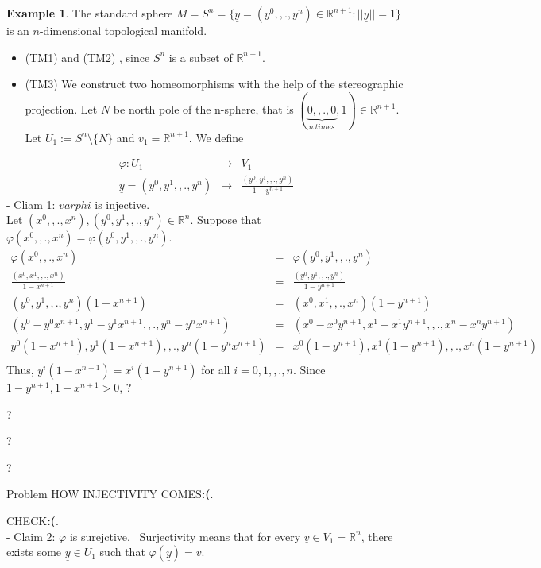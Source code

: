 \documentclass[
]{book}
\providecommand{\tightlist}{%
  \setlength{\itemsep}{0pt}\setlength{\parskip}{0pt}}
\theoremstyle{definition}
\theoremstyle{definition}
\newtheorem{example}{Example}[chapter]
\theoremstyle{definition}
\theoremstyle{definition}
\theoremstyle{remark}
\begin{document}
\begin{example}
\protect\hypertarget{exm:unnamed-chunk-10}{}\label{exm:unnamed-chunk-10}The standard sphere \(M = S^n = \{ \underline{y}=(y^0,,.,y^{n}) \in \mathbb{R}^{n+1} : ||\underline{y}|| = 1 \}\) is an \(n\)-dimensional topological manifold.

\begin{itemize}
\tightlist
\item
  (TM1) and (TM2) , since \(S^n\) is a subset of \(\mathbb{R}^{n+1}\).
\item
  (TM3) We construct two homeomorphisms with the help of the stereographic projection. Let \(N\) be north pole of the n-sphere, that is \((\underbrace{0,,.,0}_{n~times},1)\in \mathbb{R}^{n+1}\). Let \(U_1:=S^n\setminus \{N\}\) and \(v_1=\mathbb{R}^{n+1}\). We define
\end{itemize}

\begin{eqnarray}
\varphi:U_1&\to & V_1\\
\underline{y} =(y^0,y^1,,.,y^n) & \mapsto & \frac{(y^0,y^1,,.,y^n)}{1-y^{n+1}}
\end{eqnarray}
- Cliam 1: \(varphi\) is injective.\\
Let \((x^0,,.,x^{n}),(y^0,y^1,,.,y^n)\in \mathbb{R}^n\). Suppose that \(\varphi(x^0,,.,x^{n})=\varphi(y^0,y^1,,.,y^n)\).
\begin{eqnarray}
\varphi(x^0,,.,x^{n})&=&\varphi(y^0,y^1,,.,y^n)\\
\frac{(x^0,x^1,,.,x^n)}{1-x^{n+1}}&=&\frac{(y^0,y^1,,.,y^n)}{1-y^{n+1}}\\
(y^0, y^1, ,., y^n)(1-x^{n+1}) &=& (x^0, x^1, ,., x^n)(1-y^{n+1})\\
(y^0 - y^0x^{n+1}, y^1 - y^1x^{n+1}, ,., y^n - y^nx^{n+1}) &=& (x^0 - x^0y^{n+1}, x^1 - x^1y^{n+1}, ,., x^n - x^ny^{n+1})\\
y^0(1 - x^{n+1}), y^1(1 - x^{n+1}), ,., y^n (1- y^nx^{n+1}) &=&  x^0(1-y^{n+1}), x^1(1 - y^{n+1}), ,., x^n (1- y^{n+1})\\
\end{eqnarray}
Thus, \(y^i(1 - x^{n+1}) = x^i(1 -y^{n+1})\) for all \(i = 0, 1, ,., n\).
Since \(1 - y^{n+1}, 1 - x^{n+1} > 0\),
?

?

?

?

{Problem HOW INJECTIVITY COMES\textbf{:(}}.

{CHECK\textbf{:(}}.\\
- Claim 2: \(\varphi\) is surejctive.~
Surjectivity means that for every \(\underline{v} \in V_1 = \mathbb{R}^n\), there exists some \(\underline{y} \in U_1\) such that \(\varphi(\underline{y}) = \underline{v}\).


\end{example}
\end{document}
